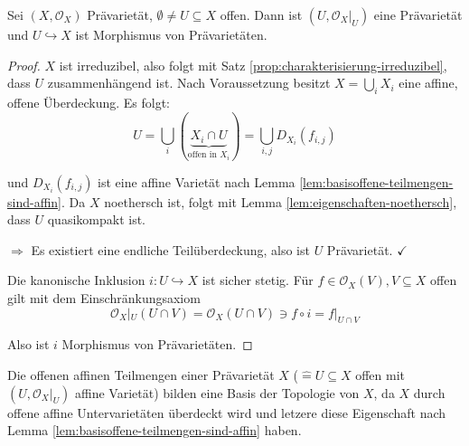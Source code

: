 \begin{prop}[orig. 42]
  \label{prop:offener-teilraum-praevarietaet}
  Sei $(X,\mathcal{O}_{X})$ Prävarietät, $\emptyset\neq U\subseteq X$
  offen. Dann ist $(U,\mathcal{O}_{X}|_{U})$ eine Prävarietät und $U\hookrightarrow X$
  ist Morphismus von Prävarietäten.
\end{prop}
\begin{proof}
  $X$ ist irreduzibel, also folgt mit Satz \ref{prop:charakterisierung-irreduzibel}, dass $U$ zusammenhängend
  ist. Nach Voraussetzung besitzt $X=\bigcup_{i} X_{i}$ eine affine, offene
  Überdeckung. Es folgt:
  \[
    U=\bigcup_{i}(\underbrace{X_{i}\cap U}_{\text{offen in }X_{i}})=\bigcup_{i,j} D_{X_{i}}(f_{i,j})
  \]

  und $D_{X_{i}}(f_{i,j})$ ist eine affine Varietät nach
  Lemma \ref{lem:basisoffene-teilmengen-sind-affin}. Da $X$ noethersch
  ist, folgt mit Lemma \ref{lem:eigenschaften-noethersch}, dass $U$ quasikompakt ist.

  $\Rightarrow$ Es existiert eine endliche Teilüberdeckung, also ist $U$ Prävarietät. $\checkmark$

  Die kanonische Inklusion $i:U\hookrightarrow X$ ist sicher stetig. Für $f\in\mathcal{O}_{X}(V), V \subseteq X$ offen gilt mit dem Einschränkungsaxiom
  \[
    \mathcal{O}_{X}|_{U}(U\cap V)=\mathcal{O}_{X}(U\cap V)\ni f\circ i=f|_{U\cap V}
  \]

  Also ist $i$ Morphismus von Prävarietäten.
\end{proof}
Die offenen affinen Teilmengen einer Prävarietät $X$ ($\hat{=} U\subseteq X$
offen mit $(U,\mathcal{O}_{X}|_{U})$ affine Varietät) bilden eine
Basis der Topologie von $X$, da $X$ durch offene affine Untervarietäten
überdeckt wird und letzere diese Eigenschaft nach Lemma \ref{lem:basisoffene-teilmengen-sind-affin} haben.
